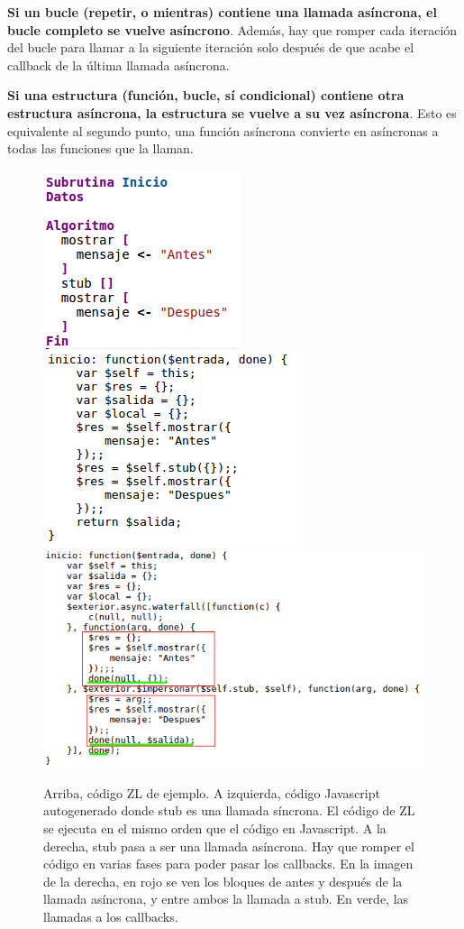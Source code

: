 \documentclass{report}
\begin{document}
	\vspace{10px}
	\noindent
	\textbf{Si un bucle (repetir, o mientras) contiene una llamada asíncrona, el bucle completo se vuelve asíncrono}. Además, hay que romper cada iteración del bucle para llamar a la siguiente iteración solo después de que acabe el callback de la última llamada asíncrona.
	
	\vspace{10px}
	\noindent
	\textbf{Si una estructura (función, bucle, sí condicional) contiene otra estructura asíncrona, la estructura se vuelve a su vez asíncrona}. Esto es equivalente al segundo punto, una función asíncrona convierte en asíncronas a todas las funciones que la llaman.
	
\begin{figure}
	\centering
	\includegraphics{asincrono}	
	\\
	
	\includegraphics[width=0.45\linewidth]{asincrono3}
	\includegraphics[width=0.45\linewidth]{asincrono2}

	\caption[Diferencias entre código asíncrono y síncrono.]{Arriba, código ZL de ejemplo. A izquierda, código Javascript autogenerado donde stub es una llamada síncrona. El código de ZL se ejecuta en el mismo orden que el código en Javascript. A la derecha, stub pasa a ser una llamada asíncrona. Hay que romper el código en varias fases para poder pasar los callbacks. En la imagen de la derecha, en rojo se ven los bloques de antes y después de la llamada asíncrona, y entre ambos la llamada a stub. En verde, las llamadas a los callbacks.}
\label{fig:asincrono}
\end{figure}
\end{document}
